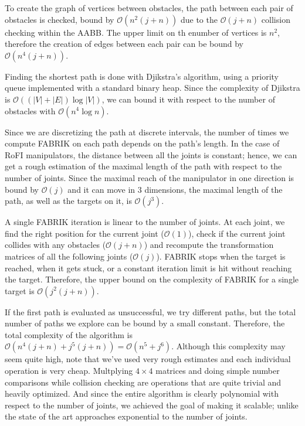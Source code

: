 To create the graph of vertices between obstacles, the path between each pair of obstacles is checked, bound by $\mathcal{O}(n^2 (j+n))$ due to the $\mathcal{O}(j+n)$ collision checking within the AABB. The upper limit on th enumber of vertices is $n^2$, therefore the creation of edges between each pair can be bound by $\mathcal{O}(n^4 (j+n))$.

Finding the shortest path is done with Djikstra's algorithm, using a priority queue implemented with a standard binary heap. Since the complexity of Djikstra is $\mathcal{O}((|V|+|E|) \log{|V|})$, we can bound it with respect to the number of obstacles with $\mathcal{O}(n^4 \log{n})$.

Since we are discretizing the path at discrete intervals, the number of times we compute FABRIK on each path depends on the path's length. In the case of RoFI manipulators, the distance between all the joints is constant; hence, we can get a rough estimation of the maximal length of the path with respect to the number of joints. Since the maximal reach of the manipulator in one direction is bound by $\mathcal{O}(j)$ and it can move in 3 dimensions, the maximal length of the path, as well as the targets on it, is $\mathcal{O}(j^3)$.

A single FABRIK iteration is linear to the number of joints. At each joint, we find the right position for the current joint ($\mathcal{O}(1)$), check if the current joint collides with any obstacles ($\mathcal{O}(j+n)$) and recompute the transformation matrices of all the following joints ($\mathcal{O}(j)$). FABRIK stops when the target is reached, when it gets stuck, or a constant iteration limit is hit without reaching the target. Therefore, the upper bound on the complexity of FABRIK for a single target is $\mathcal{O}(j^2(j+n))$.

If the first path is evaluated as unsuccessful, we try different paths, but the total number of paths we explore can be bound by a small constant. Therefore, the total complexity of the algorithm is $\mathcal{O}(n^4(j+n)+j^5(j+n)) = \mathcal{O}(n^5+j^6)$. Although this complexity may seem quite high, note that we've used very rough estimates and each individual operation is very cheap. Multplying $4 \times 4$ matrices and doing simple number comparisons while collision checking are operations that are quite trivial and heavily optimized. And since the entire algorithm is clearly polynomial with respect to the number of joints, we achieved the goal of making it scalable; unlike the state of the art approaches exponential to the number of joints.
